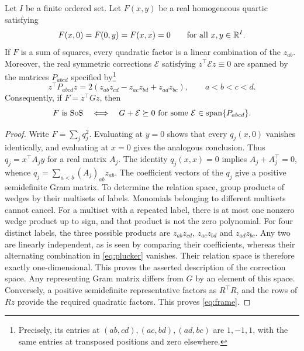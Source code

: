 \begin{lemma}\label{lem:frame}
Let $I$ be a finite ordered set. Let \(F(x,y)\) be a real homogeneous quartic satisfying
\begin{equation}
    \label{vanish}
    F(x,0)=F(0,y)=F(x,x)=0
    \qquad
    \text{for all }x,y\in\mathbb{R}^I.\end{equation}
 If $F$ is a sum of squares, every quadratic factor is
a linear combination of the $z_{ab}$.
Moreover, the real symmetric corrections $\mathcal E$ satisfying
$z^\top\mathcal E z\equiv0$ are spanned by the matrices
$P_{abcd}$ specified by\footnote{Precisely, its entries at $(ab,cd),(ac,bd),(ad,bc)$ are $1,-1,1$, with the same entries at transposed positions and zero elsewhere.}
\begin{equation}\label{eq:plucker}
 z^\top P_{abcd}z
 =2(z_{ab}z_{cd}-z_{ac}z_{bd}+z_{ad}z_{bc}),
 \qquad a<b<c<d.
\end{equation}
Consequently, if $F=z^\top Gz$, then
\begin{equation}\label{eq:frame}
 F\text{ is SoS}
 \quad\Longleftrightarrow\quad
 G+\mathcal E\succeq0\text{ for some }\mathcal E\in\operatorname{span}\{P_{abcd}\}.
\end{equation}
\end{lemma}
\begin{proof}

Write $F=\sum_jq_j^2$. Evaluating at $y=0$ shows that every
$q_j(x,0)$ vanishes identically, and evaluating at $x=0$ gives the
analogous conclusion. Thus $q_j=x^\top A_jy$ for a real matrix $A_j$.
The identity $q_j(x,x)=0$ implies $A_j+A_j^\top=0$, whence
$q_j=\sum_{a<b}(A_j)_{ab}z_{ab}$. The coefficient vectors of the
$q_j$ give a positive semidefinite Gram matrix. 
To determine the relation space, group products of wedges by their
multisets of labels. Monomials belonging to different multisets cannot
cancel. For a multiset with a repeated label, there is at most one
nonzero wedge product up to sign, and that product is not the zero
polynomial. For four distinct labels, the three possible products are
$z_{ab}z_{cd}$, $z_{ac}z_{bd}$ and $z_{ad}z_{bc}$. Any two are linearly
independent, as is seen by comparing their coefficients, whereas their
alternating combination in \eqref{eq:plucker} vanishes. Their relation
space is therefore exactly one-dimensional. This proves the asserted
description of the correction space. 
Any representing Gram matrix differs from $G$ by an element of this
space. Conversely, a positive semidefinite representative factors as
$R^\top R$, and the rows of $Rz$ provide the required quadratic factors.
This proves \eqref{eq:frame}.
\end{proof}

